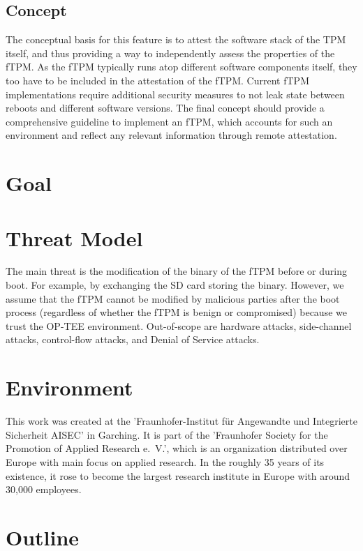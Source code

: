 \subsection{Concept}
The conceptual basis for this feature is to attest the software stack of the TPM itself, and thus providing a way to independently assess the properties of the fTPM.
As the fTPM typically runs atop different software components itself, they too have to be included in the attestation of the fTPM.
Current fTPM implementations require additional security measures to not leak state between reboots and different software versions.
The final concept should provide a comprehensive guideline to implement an fTPM, which accounts for such an environment and reflect any relevant information through remote attestation.

\section{Goal}
\section{Threat Model}

The main threat is the modification of the binary of the fTPM before or during boot. For example, by exchanging the SD card storing the binary.
However, we assume that the fTPM cannot be modified by malicious parties after the boot process (regardless of whether the fTPM is benign or compromised) because we trust the OP-TEE environment.
Out-of-scope are hardware attacks, side-channel attacks, control-flow attacks, and Denial of Service attacks.



\section{Environment}

This work was created at the 'Fraunhofer-Institut für Angewandte und Integrierte Sicherheit AISEC' in Garching.
It is part of the 'Fraunhofer Society for the Promotion of Applied Research e.~V.', which is an organization distributed over Europe with main focus on applied research.
In the roughly 35 years of its existence, it rose to become the largest research institute in Europe with around 30,000 employees.

\section{Outline}

